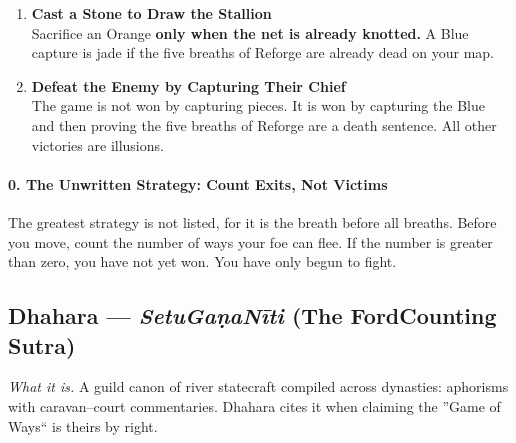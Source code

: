 \documentclass[11pt]{article}
\begin{document}
\begin{enumerate}[leftmargin=\textit{,label=\textbf{\arabic}.}]
\item \textbf{Cast a Stone to Draw the Stallion}\\
Sacrifice an Orange \textbf{only when the net is already knotted.} A Blue capture is jade if the five breaths of Reforge are already dead on your map.

\item \textbf{Defeat the Enemy by Capturing Their Chief}\\
The game is not won by capturing pieces. It is won by capturing the Blue and then proving the five breaths of Reforge are a death sentence. All other victories are illusions.
\end{enumerate}

\paragraph*{0. The Unwritten Strategy: Count Exits, Not Victims}
The greatest strategy is not listed, for it is the breath before all breaths. Before you move, count the number of ways your foe can flee. If the number is greater than zero, you have not yet won. You have only begun to fight.

\clearpage

\subsection{Dhahara --- \textit{Setu\textendash Gaṇa\textendash Nīti} (The Ford\textendash Counting Sutra)}
\textit{What it is.} A guild canon of river statecraft compiled across dynasties: aphorisms with caravan--court commentaries. Dhahara cites it when claiming the ''Game of Ways`` is theirs by right.
\end{document}
